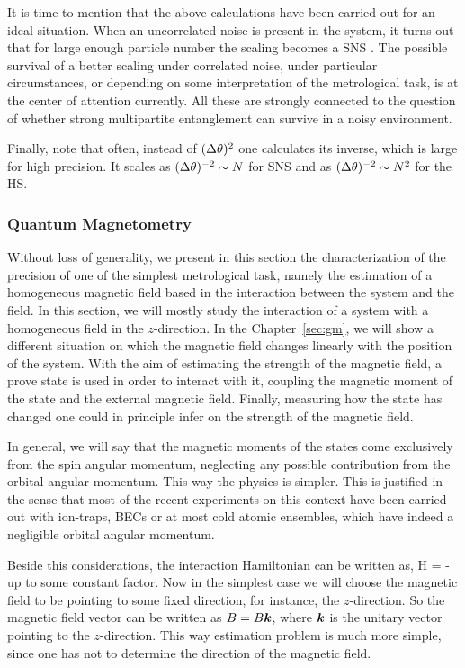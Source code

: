 It is time to mention that the above calculations have been carried out for an ideal situation.
When an uncorrelated noise is present in the system, it turns out that for large enough particle number the scaling becomes a SNS \citep{}.
The possible survival of a better scaling under correlated noise, under particular circumstances, or depending on some interpretation of the metrological task, is at the center of attention currently.
All these are strongly connected to the question of whether strong multipartite entanglement can survive in a noisy environment.

Finally, note that often, instead of $(\Delta \theta )^2$ one calculates its inverse, which is large for high precision.
It scales as $(\Delta \theta )^{-2}\sim N$ for SNS and as $(\Delta \theta )^{-2}\sim N^2$ for the HS.

\subsubsection{Quantum Magnetometry}
\label{sec:bg-quantum-metro}

Without loss of generality, we present in this section the characterization of the precision of one of the simplest metrological task, namely the estimation of a homogeneous magnetic field based in the interaction between the system and the field.
In this section, we will mostly study the interaction of a system with a homogeneous field in the $z$-direction.
In the Chapter~\ref{sec:gm}, we will show a different situation on which the magnetic field changes linearly with the position of the system.
With the aim of estimating the strength of the magnetic field, a prove state is used in order to interact with it, coupling the magnetic moment of the state and the external magnetic field.
Finally, measuring how the state has changed one could in principle infer on the strength of the magnetic field.

In general, we will say that the magnetic moments of the states come exclusively from the spin angular momentum, neglecting any possible contribution from the orbital angular momentum.
This way the physics is simpler.
This is justified in the sense that most of the recent experiments on this context have been carried out with ion-traps, BECs or at most cold atomic ensembles, which have indeed a negligible orbital angular momentum.

Beside this considerations, the interaction Hamiltonian can be written as,
\be
  H = - \bs{\mu} \cdot {}
\ee
up to some constant factor.
Now in the simplest case we will choose the magnetic field to be pointing to some fixed direction, for instance, the $z$-direction.
So the magnetic field vector can be written as ${B}=B\boldsymbol{k}$, where $\boldsymbol{k}$ is the unitary vector pointing to the $z$-direction.
This way estimation problem is much more simple, since one has not to determine the direction of the magnetic field.

